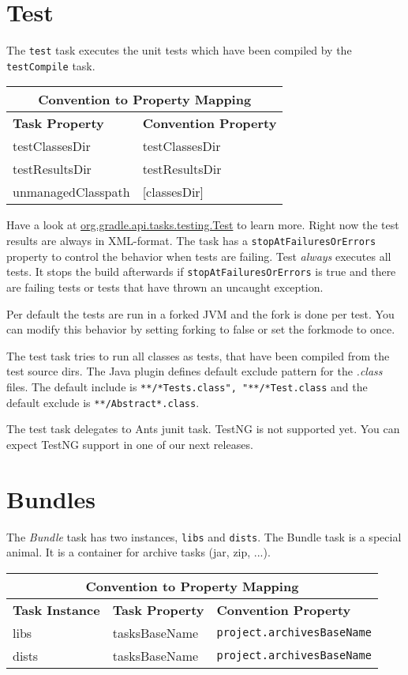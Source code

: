 \section{Test} %
\label{sec:java_test}
The \texttt{test} task executes the unit tests which have been compiled by the \texttt{testCompile} task. 
\begin{center}
	\begin{tabular}{|l|l|} \hline
		\multicolumn{2}{|c|}{Convention to Property Mapping} \\ \hline
	    \textbf{Task Property} & \textbf{Convention Property} \\ \hline
		testClassesDir & testClassesDir \\ \hline
		testResultsDir & testResultsDir \\ \hline
		unmanagedClasspath & [classesDir] \\ \hline
	\end{tabular} 
\end{center}
\noindent Have a look at \href{\API tasks/testing/Test.html}{org.gradle.api.tasks.testing.Test} to learn more. Right now the test results are always in XML-format. The task has a \texttt{stopAtFailuresOrErrors} property to control the behavior when tests are failing. Test \emph{always} executes all tests. It stops the build afterwards if \texttt{stopAtFailuresOrErrors} is true and there are failing tests or tests that have thrown an uncaught exception. 

Per default the tests are run in a forked JVM and the fork is done per test. You can modify this behavior by setting forking to false or set the forkmode to once.

The test task tries to run all classes as tests, that have been compiled from the test source dirs. The Java plugin defines default exclude pattern for the \emph{.class} files. The default include is \texttt{**/*Tests.class", "**/*Test.class} and the default exclude is \texttt{**/Abstract*.class}. 

The test task delegates to Ants junit task. TestNG is not supported yet. You can expect TestNG support in one of our next releases. 

\section{Bundles} %
\label{sec:bundles}
The \emph{Bundle} task has two instances, \texttt{libs} and \texttt{dists}. The Bundle task is a special animal. It is a container for archive tasks (jar, zip, ...).  
\begin{center}
	\begin{tabular}{|l|l|l|} \hline
		\multicolumn{3}{|c|}{Convention to Property Mapping} \\ \hline
		\textbf{Task Instance} & \textbf{Task Property} & \textbf{Convention Property} \\ \hline
		libs & tasksBaseName & \texttt{project.archivesBaseName} \\ \hline
		dists & tasksBaseName & \texttt{project.archivesBaseName} \\ \hline
	\end{tabular} 
\end{center}
